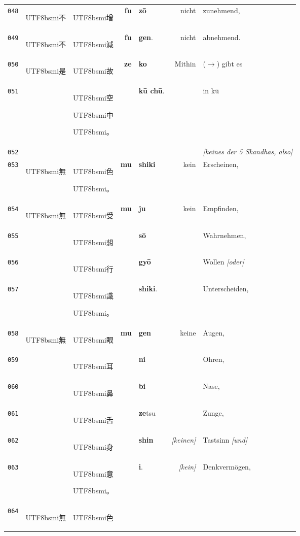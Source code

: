 \documentclass[
DIV=calc,
BCOR=5mm,
11pt,
headings=small,
oneside,
bibtotocnumbered]{scrartcl}
\newcommand{\cnbsmi}[1]{\begin{CJK}{UTF8}{bsmi}#1\end{CJK}}
\begin{document}
\begin{center}
\begin{tabular}{r|rl|rl|rl}
\hdashline
{\tiny\texttt{048}}&
  \cnbsmi{不} & \cnbsmi{增} &
  \textbf{fu} & \textbf{zō} &
  \textrm{nicht} & \textrm{zunehmend}, \\
{\tiny\texttt{049}}&
  \cnbsmi{不} & \cnbsmi{減} &
  \textbf{fu} & \textbf{gen}. &
  \textrm{nicht} & \textrm{abnehmend}. \\
\hline
{\tiny\texttt{050}}&
  \cnbsmi{是} & \cnbsmi{故} &
  \textbf{ze} & \textbf{ko} &
  \textrm{Mithin} & {\tiny ($\rightarrow$)} \textrm{gibt es}\\
{\tiny\texttt{051}}&
  ~ & \cnbsmi{空} \cnbsmi{中} \cnbsmi{。} &
  ~ & \textbf{kū chū}. &
  ~ & \textrm{in kū} \\
{\tiny\texttt{052}}&
  ~ & ~  & ~ & ~ &  ~ & \textrm{\emph{[keines der 5 Skandhas, also]}} \\
{\tiny\texttt{053}}&
  \cnbsmi{無} & \cnbsmi{色} \cnbsmi{。} &
  \textbf{mu} & \textbf{shiki} &
  \textrm{kein} & \textrm{Erscheinen}, \\
{\tiny\texttt{054}}&
  \cnbsmi{無} & \cnbsmi{受} &
  \textbf{mu} & \textbf{ju} & 
  \textrm{kein} & \textrm{Empfinden,} \\
{\tiny\texttt{055}}&
  ~ & \cnbsmi{想} &
  ~ & \textbf{sō} &
  ~ & \textrm{Wahrnehmen,} \\
{\tiny\texttt{056}}&
  ~ & \cnbsmi{行} &
  ~ & \textbf{gyō} &
  ~ & \textrm{Wollen \emph{[oder]}} \\
{\tiny\texttt{057}}&
  ~ & \cnbsmi{識} \cnbsmi{。} &
  ~ & \textbf{shiki}. & 
  ~ & \textrm{Unterscheiden}, \\
\hdashline
 {\tiny\texttt{058}}&
  \cnbsmi{無} & \cnbsmi{眼} &
  \textbf{mu} & \textbf{gen} &
  \textrm{keine} & \textrm{Augen,} \\
{\tiny\texttt{059}}&
  ~ & \cnbsmi{耳} &
  ~ & \textbf{ni} &
  ~ & \textrm{Ohren,} \\
{\tiny\texttt{060}}&
  ~ & \cnbsmi{鼻} &
  ~ & \textbf{bi} &
  ~ & \textrm{Nase,} \\
{\tiny\texttt{061}}&
  ~ & \cnbsmi{舌} &
  ~ & \textbf{ze}\tiny{tsu}&
  ~ & \textrm{Zunge,} \\
{\tiny\texttt{062}}&
  ~ & \cnbsmi{身} &
  ~ & \textbf{shin} &
  \textrm{\emph{[keinen]}} & \textrm{Tastsinn \emph{[und]}} \\
{\tiny\texttt{063}}&
  ~ & \cnbsmi{意} \cnbsmi{。} &
  ~ & \textbf{i}. & 
  \textrm{\emph{[kein]}} & \textrm{Denkvermögen}, \\
\hdashline
{\tiny\texttt{064}}&
   \cnbsmi{無} & \cnbsmi{色} &

\end{tabular}
\end{center}
\end{document}
